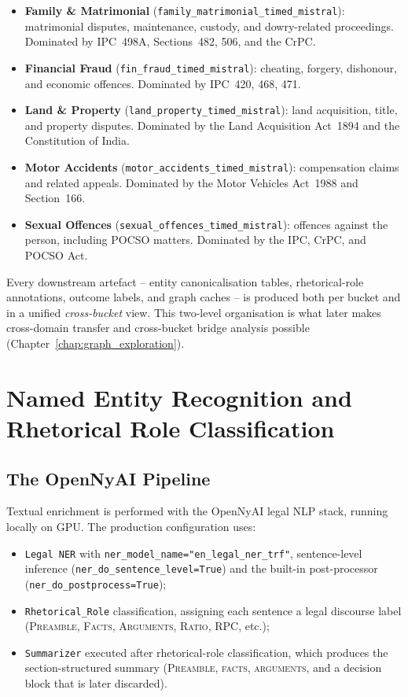 \begin{itemize}
  \item \textbf{Family \& Matrimonial} (\texttt{family\_matrimonial\_timed\_mistral}):
    matrimonial disputes, maintenance, custody, and dowry-related
    proceedings. Dominated by IPC~498A, Sections~482, 506, and the CrPC.
  \item \textbf{Financial Fraud} (\texttt{fin\_fraud\_timed\_mistral}):
    cheating, forgery, dishonour, and economic offences. Dominated by
    IPC~420, 468, 471.
  \item \textbf{Land \& Property} (\texttt{land\_property\_timed\_mistral}):
    land acquisition, title, and property disputes. Dominated by the
    Land Acquisition Act~1894 and the Constitution of India.
  \item \textbf{Motor Accidents} (\texttt{motor\_accidents\_timed\_mistral}):
    compensation claims and related appeals. Dominated by the Motor
    Vehicles Act~1988 and Section~166.
  \item \textbf{Sexual Offences} (\texttt{sexual\_offences\_timed\_mistral}):
    offences against the person, including POCSO matters. Dominated by
    the IPC, CrPC, and POCSO Act.
\end{itemize}

Every downstream artefact -- entity canonicalisation tables,
rhetorical-role annotations, outcome labels, and graph caches -- is
produced both per bucket and in a unified \emph{cross-bucket} view.
This two-level organisation is what later makes cross-domain transfer
and cross-bucket bridge analysis possible
(Chapter~\ref{chap:graph_exploration}).

\section{Named Entity Recognition and Rhetorical Role Classification}

\subsection{The OpenNyAI Pipeline}

Textual enrichment is performed with the OpenNyAI legal NLP stack,
running locally on GPU. The production configuration uses:

\begin{itemize}
  \item \texttt{Legal NER} with
    \texttt{ner\_model\_name="en\_legal\_ner\_trf"}, sentence-level
    inference (\texttt{ner\_do\_sentence\_level=True}) and the built-in
    post-processor (\texttt{ner\_do\_postprocess=True});
  \item \texttt{Rhetorical\_Role} classification, assigning each
    sentence a legal discourse label (\textsc{Preamble}, \textsc{Facts},
    \textsc{Arguments}, \textsc{Ratio}, \textsc{RPC}, etc.);
  \item \texttt{Summarizer} executed after rhetorical-role
    classification, which produces the section-structured summary
    (\textsc{Preamble}, \textsc{facts}, \textsc{arguments}, and a
    decision block that is later discarded).
\end{itemize}

